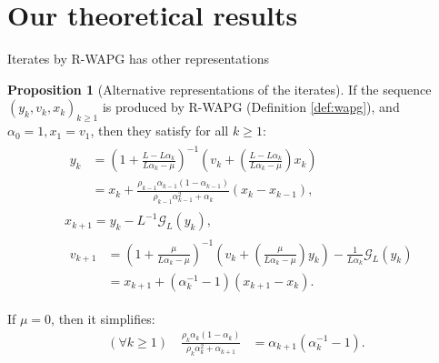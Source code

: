 \documentclass[11pt]{beamer}
\theoremstyle{definition}
\newtheorem{proposition}{Proposition}[section]
\begin{document}
\section{Our theoretical results}
    \begin{frame}{Iterates by R-WAPG has other representations}
        \begin{proposition}[Alternative representations of the iterates]\label{prop:wapg-first-equivalent-repr}
            If the sequence $(y_k, v_k, x_k)_{k \ge 1}$ is produced by R-WAPG (Definition \ref{def:wapg}), and $\alpha_0 = 1, x_1 = v_1$, then they satisfy for all $k\ge 1$: 
            {\footnotesize
            \begin{align}
                & \begin{aligned}
                    y_{k} &=
                    \left(
                        1 + \frac{L - L\alpha_{k}}{L\alpha_{k} - \mu}
                    \right)^{-1}
                    \left(
                        v_{k} +
                        \left(\frac{L - L\alpha_{k}}{L\alpha_{k} - \mu} \right) x_{k}
                    \right)
                    \\
                    &= x_{k} +
                    \frac{\rho_{k - 1}\alpha_{k - 1}(1 - \alpha_{k - 1})}
                    {\rho_{k - 1}\alpha_{k - 1}^2 + \alpha_{k}}(x_{k} - x_{k - 1}), 
                \end{aligned}
                \\
                & x_{k + 1} =
                y_k - L^{-1} \mathcal G_L (y_k),
                \\
                & \begin{aligned}
                    v_{k + 1} 
                    &=
                    \left(
                        1 + \frac{\mu}{L \alpha_k - \mu}
                    \right)^{-1}
                    \left(
                        v_k +
                        \left(\frac{\mu}{L \alpha_k - \mu}\right) y_k
                    \right) - \frac{1}{L\alpha_{k}}\mathcal G_L (y_k)
                    \\
                    &= 
                    x_{k + 1} + (\alpha_k^{-1} - 1)(x_{k + 1} - x_k).
                \end{aligned}
            \end{align}
            }
        \end{proposition}
        If $\mu = 0$, then it simplifies:
        {\small
        \begin{align*}
            (\forall k \ge 1) \quad
            \frac{\rho_k\alpha_k(1 - \alpha_k)}{\rho_k\alpha_k^2 + \alpha_{k + 1}}
            & = \alpha_{k + 1}(\alpha_k^{-1} - 1).
        \end{align*}
        }
    \end{frame}
\end{document}
